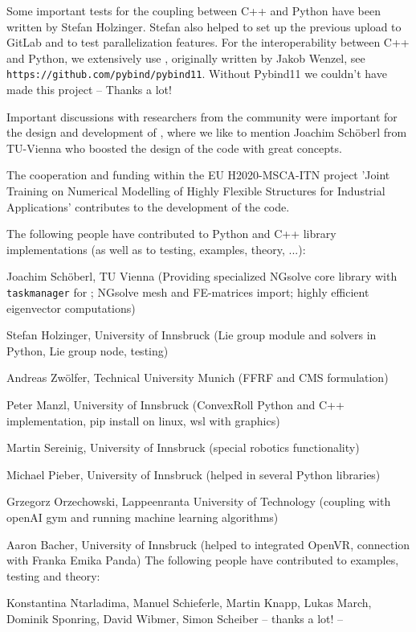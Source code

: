 Some important tests for the coupling between C++ and Python have been written by Stefan Holzinger. Stefan also helped to set up the previous upload to GitLab and to test parallelization features.
For the interoperability between C++ and Python, we extensively use \cite{pybind11}, originally written by Jakob Wenzel, see \texttt{https://github.com/pybind/pybind11}. Without Pybind11 we couldn't have made this project -- Thanks a lot!

Important discussions with researchers from the community were important for the design and development of \codeName , where we like to mention Joachim Sch{\"o}berl from TU-Vienna who boosted the design of the code with great concepts. 

The cooperation and funding within the EU H2020-MSCA-ITN project 'Joint Training on Numerical Modelling of Highly Flexible Structures for Industrial Applications' contributes to the development of the code.

The following people have contributed to Python and C++ library implementations (as well as to testing, examples, theory, ...):
\bi
  \item Joachim Sch{\"o}berl, TU Vienna (Providing specialized NGsolve \cite{Schoeberl1997,NGsolve2014,NGsolve2022} core library with \texttt{taskmanager} for ; NGsolve mesh and FE-matrices import; highly efficient eigenvector computations)
  \item Stefan Holzinger, University of Innsbruck (Lie group module and solvers in Python, Lie group node, testing)
  \item Andreas Zw{\"o}lfer, Technical University Munich (FFRF and CMS formulation)
  \item Peter Manzl, University of Innsbruck (ConvexRoll Python and C++ implementation, pip install on linux, wsl with graphics)
  \item Martin Sereinig, University of Innsbruck (special robotics functionality)
  \item Michael Pieber, University of Innsbruck (helped in several Python libraries)
  \item Grzegorz Orzechowski, Lappeenranta University of Technology (coupling with openAI gym and running machine learning algorithms)
  \item Aaron Bacher, University of Innsbruck (helped to integrated OpenVR, connection with Franka Emika Panda)
\ei
The following people have contributed to examples, testing and theory:
\bi
  \item Konstantina Ntarladima, Manuel Schieferle, Martin Knapp, Lukas March, Dominik Sponring, David Wibmer, Simon Scheiber
\ei
-- thanks a lot! --
%
\newpage
{}
%


